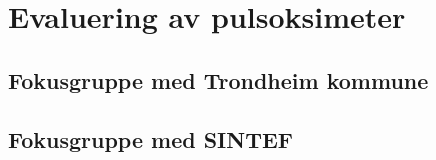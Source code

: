 \chapter{Evaluering av pulsoksimeter}
\label{ch:evaluation1}

\section{Fokusgruppe med Trondheim kommune}
\section{Fokusgruppe med SINTEF}